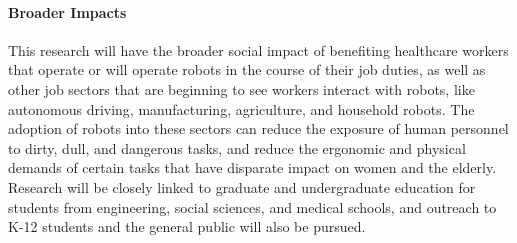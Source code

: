 
\vspace{0.5 em}

\paragraph*{\Large Broader Impacts}
This research will have the broader social impact of benefiting healthcare workers that operate or will operate robots in the course of their job duties, as well as other job sectors that are beginning to see workers interact with robots, like autonomous driving, manufacturing, agriculture, and household robots. The adoption of robots into these sectors can reduce the exposure of human personnel to dirty, dull, and dangerous tasks, and reduce the ergonomic and physical demands of certain tasks that have disparate impact on women and the elderly.  Research will be closely linked to graduate and undergraduate education for students from engineering, social sciences, and medical schools, and outreach to K-12 students and the general public will also be pursued. 

\pagebreak

